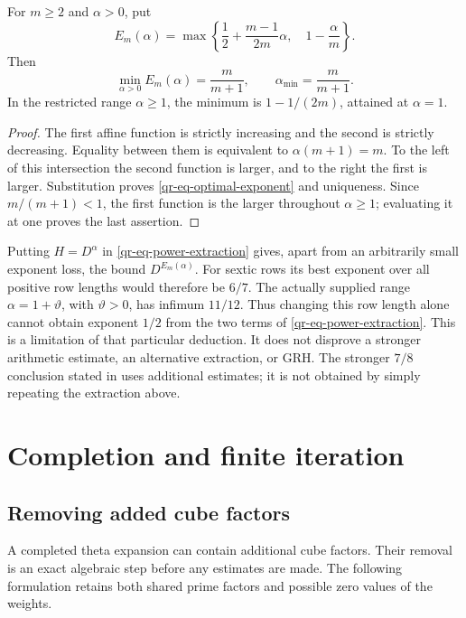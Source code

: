 \begin{proposition}\label{qr-prop-exponent-limit}
For $m\geq2$ and $\alpha>0$, put
\[
 E_m(\alpha)=\max\left\{
     \frac12+\frac{m-1}{2m}\alpha,\quad
     1-\frac\alpha m\right\}.
\]
Then
\begin{equation}\label{qr-eq-optimal-exponent}
 \min_{\alpha>0}E_m(\alpha)=\frac{m}{m+1},
 \qquad\alpha_{\min}=\frac{m}{m+1}.
\end{equation}
In the restricted range $\alpha\geq1$, the minimum is
$1-1/(2m)$, attained at $\alpha=1$.
\end{proposition}

\begin{proof}
The first affine function is strictly increasing and the second is
strictly decreasing. Equality between them is equivalent to
$\alpha(m+1)=m$. To the left of this intersection the second
function is larger, and to the right the first is larger.
Substitution proves \eqref{qr-eq-optimal-exponent} and uniqueness.
Since $m/(m+1)<1$, the first function is the larger throughout
$\alpha\geq1$; evaluating it at one proves the last assertion.
\end{proof}

Putting $H=D^\alpha$ in \eqref{qr-eq-power-extraction} gives, apart
from an arbitrarily small exponent loss, the bound $D^{E_m(\alpha)}$.
For sextic rows its best exponent over all positive row lengths would
therefore be $6/7$. The actually supplied range
$\alpha=1+\vartheta$, with $\vartheta>0$, has infimum $11/12$.
Thus changing this row length alone cannot obtain exponent $1/2$
from the two terms of \eqref{qr-eq-power-extraction}. This is a
limitation of that particular deduction. It does not disprove a
stronger arithmetic estimate, an alternative extraction, or GRH.
The stronger $7/8$ conclusion stated in \cite{OpenAISeptember}
uses additional estimates; it is not obtained by simply repeating
the extraction above.

\section{Completion and finite iteration}
\label{qr-sec-iteration}

\subsection{Removing added cube factors}

A completed theta expansion can contain additional cube factors.
Their removal is an exact algebraic step before any estimates are made.
The following formulation retains both shared prime factors and
possible zero values of the weights.

